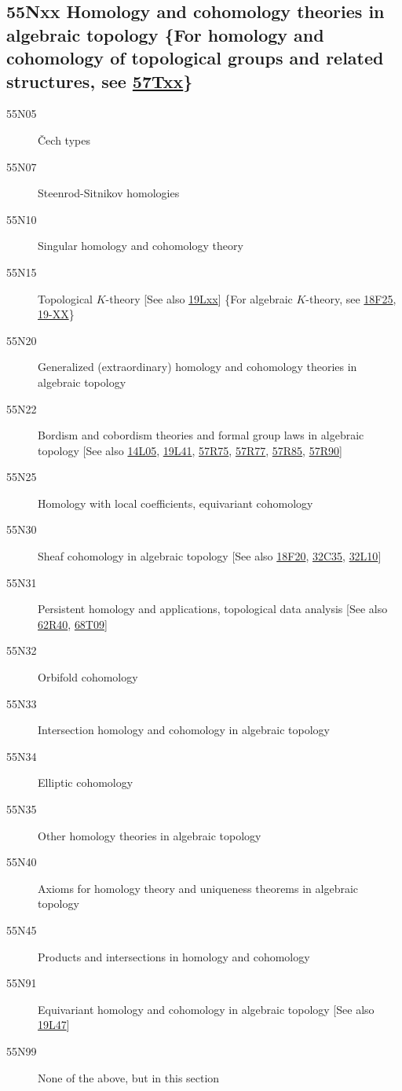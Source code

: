 \subsection*{55Nxx  Homology and cohomology theories in algebraic topology \{For homology and cohomology of topological groups and related structures, see \hyperref[57Txx]{57Txx}\} }\label{55Nxx}
\begin{description}  
\item [55N05]\label{55N05} \v{C}ech types
\item [55N07]\label{55N07} Steenrod-Sitnikov homologies
\item [55N10]\label{55N10} Singular homology and cohomology theory
\item [55N15]\label{55N15} Topological $K$-theory [See also \hyperref[19Lxx]{19Lxx}] \{For algebraic $K$-theory, see \hyperref[18F25]{18F25}, \hyperref[19-XX]{19-XX}\}
\item [55N20]\label{55N20} Generalized (extraordinary) homology and cohomology theories in algebraic topology
\item [55N22]\label{55N22} Bordism and cobordism theories and formal group laws in algebraic topology [See also \hyperref[14L05]{14L05}, \hyperref[19L41]{19L41}, \hyperref[57R75]{57R75}, \hyperref[57R77]{57R77}, \hyperref[57R85]{57R85}, \hyperref[57R90]{57R90}]
\item [55N25]\label{55N25} Homology with local coefficients, equivariant cohomology
\item [55N30]\label{55N30} Sheaf cohomology in algebraic topology [See also \hyperref[18F20]{18F20}, \hyperref[32C35]{32C35}, \hyperref[32L10]{32L10}]
\item [55N31]\label{55N31} Persistent homology and applications, topological data analysis [See also \hyperref[62R40]{62R40}, \hyperref[68T09]{68T09}]
\item [55N32]\label{55N32} Orbifold cohomology
\item [55N33]\label{55N33} Intersection homology and cohomology in algebraic topology
\item [55N34]\label{55N34} Elliptic cohomology
\item [55N35]\label{55N35} Other homology theories in algebraic topology
\item [55N40]\label{55N40} Axioms for homology theory and uniqueness theorems in algebraic topology
\item [55N45]\label{55N45} Products and intersections in homology and cohomology
\item [55N91]\label{55N91} Equivariant homology and cohomology in algebraic topology [See also \hyperref[19L47]{19L47}]
\item [55N99]\label{55N99} None of the above, but in this section
\end{description}
